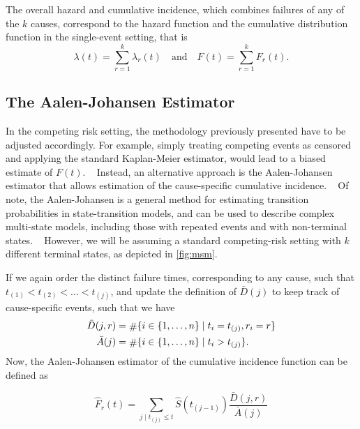 The overall hazard and cumulative incidence, 
which combines failures of any of the \(k\) causes,
correspond to the hazard function 
and the cumulative distribution function 
in the single-event setting, that is
\begin{equation}
    \lambda(t) = \sum_{r=1}^{k} \lambda_r(t)
    \quad \text{and} \quad
    F(t) = \sum_{r=1}^{k} F_r(t).
\end{equation}

\subsection{The Aalen-Johansen Estimator}

In the competing risk setting, 
the methodology previously presented
have to be adjusted accordingly.
For example, 
simply treating competing events as censored 
and applying the standard Kaplan-Meier estimator, 
would lead to a biased estimate of \(F(t)\).
~\autocite{pepeKaplan1993}
Instead, an alternative approach is the Aalen-Johansen estimator
that allows estimation of the cause-specific cumulative incidence.
~\autocite{aalenEmpirical1978}
Of note, the Aalen-Johansen is a general method for estimating
transition probabilities in state-transition models,
and can be used to describe complex multi-state models,
including those with repeated events and with non-terminal states.
~\autocite{survival-package}
However, we will be assuming a standard competing-risk setting
with \(k\) different terminal states, 
as depicted in \cref{fig:msm}.
 
If we again order the distinct failure times, 
corresponding to any cause, 
such that
\(t_{(1)} < t_{(2)} < \ldots < t_{(j)}\),
and update the definition of \(\bar{D}(j)\) to keep track of cause-specific
events, such that we have
\begin{equation}
\begin{aligned}
    \bar{D}(j, r) &= \card \{i \in \{1, \dots, n\} \mid t_i = t_{(j)}, r_i = r\} \\
    \bar{A}(j)    &= \card \{i \in \{1, \dots, n\} \mid t_i > t_{(j)}\}.
\end{aligned}
\end{equation}
Now, the Aalen-Johansen estimator of the cumulative incidence function
can be defined as 

\begin{equation}
    \widehat{F}_r(t)
    =   \sum_{j \mid t_{(j)} \leq t}{
        \!\!
        \widehat{S}(t_{(j-1)})
        \frac{\bar{D}(j, r)}{\bar{A}(j)}
    }
\end{equation}

